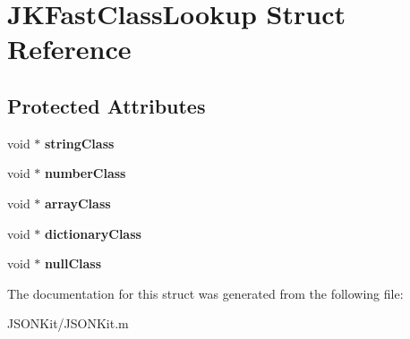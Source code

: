 \hypertarget{struct_j_k_fast_class_lookup}{\section{J\+K\+Fast\+Class\+Lookup Struct Reference}
\label{struct_j_k_fast_class_lookup}
}
\subsection*{Protected Attributes}
\begin{DoxyCompactItemize}
\item 
\hypertarget{struct_j_k_fast_class_lookup_acd04a4b7e019d6a55790817b854128a2}{void $\ast$ {\bfseries string\+Class}}\label{struct_j_k_fast_class_lookup_acd04a4b7e019d6a55790817b854128a2}

\item 
\hypertarget{struct_j_k_fast_class_lookup_a603079acbc76d7743d135768f77baa85}{void $\ast$ {\bfseries number\+Class}}\label{struct_j_k_fast_class_lookup_a603079acbc76d7743d135768f77baa85}

\item 
\hypertarget{struct_j_k_fast_class_lookup_ab0f7be4ff84fd61097b479e03cb6de94}{void $\ast$ {\bfseries array\+Class}}\label{struct_j_k_fast_class_lookup_ab0f7be4ff84fd61097b479e03cb6de94}

\item 
\hypertarget{struct_j_k_fast_class_lookup_a52147c32a09cabb2ffa9ff7ac1a27e5b}{void $\ast$ {\bfseries dictionary\+Class}}\label{struct_j_k_fast_class_lookup_a52147c32a09cabb2ffa9ff7ac1a27e5b}

\item 
\hypertarget{struct_j_k_fast_class_lookup_a8399859e5563a816499b6d2ffdfb55ca}{void $\ast$ {\bfseries null\+Class}}\label{struct_j_k_fast_class_lookup_a8399859e5563a816499b6d2ffdfb55ca}

\end{DoxyCompactItemize}


The documentation for this struct was generated from the following file\+:\begin{DoxyCompactItemize}
\item 
J\+S\+O\+N\+Kit/J\+S\+O\+N\+Kit.\+m\end{DoxyCompactItemize}
